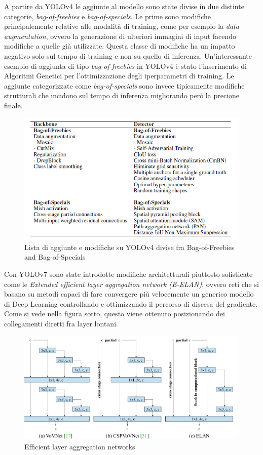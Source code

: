 \documentclass[12pt,a4paper,openright,twoside]{report}
\begin{document}
A partire da YOLOv4 le aggiunte al modello sono state divise in due distinte categorie, \emph{bag-of-freebies} e \emph{bag-of-specials}.
Le prime sono modifiche principalemente relative alle modalità di training, come per esempio la \emph{data augmentation}, ovvero la generazione di ulteriori immagini di input facendo modifiche a quelle già utilizzate. Questa classe di modifiche ha un impatto negativo solo sul tempo di training e non su quello di inferenza. 
Un'interessante esempio di aggiunta di tipo \emph{bag-of-freebies} in YOLOv4 è stato l'inserimento di Algoritmi Genetici per l'ottimizzazione degli iperparametri di training.
Le aggiunte categorizzate come \emph{bag-of-specials} sono invece tipicamente modifiche strutturali che incidono sul tempo di inferenza migliorando però la precione finale.
\begin{figure}[h]
\centering
\includegraphics[width=\linewidth]{bagofreebies.png}
\caption{Lista di aggiunte e modifiche su YOLOv4 divise fra Bag-of-Freebies and Bag-of-Specials}
\end{figure}
Con YOLOv7 sono state introdotte modifiche architetturali piuttosto sofisticate come le \emph{Extended efficient layer aggregation network (E-ELAN)}, ovvero reti che si basano su metodi capaci di fare convergere più velocemente un generico modello di Deep Learning controllando e ottimizzando il percorso di discesa del gradiente. Come si vede nella figura sotto, questo viene ottenuto posizionando dei collegamenti diretti fra layer lontani.\cite{elan}
\begin{figure}[h]
\centering
\includegraphics[width=\linewidth]{elan.png}
\caption{Efficient layer aggregation networks}
\end{figure}
\end{document}
